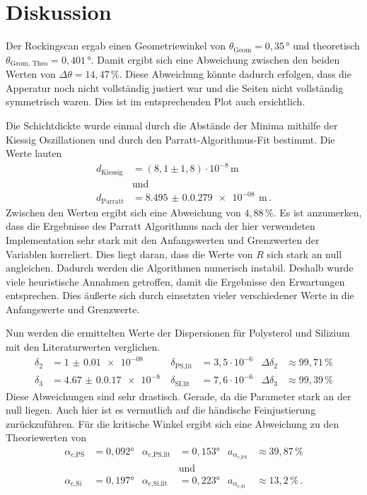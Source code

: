 \section{Diskussion}
\label{sec:Diskussion}

Der Rockingscan ergab einen Geometriewinkel von $\theta_\text{Geom} = 0{,}35 \, \unit\degree$ und theoretisch
$\theta_\text{Geom, Theo} = 0{,}401 \, \unit\degree$.
Damit ergibt sich eine Abweichung zwischen den beiden Werten von $\Delta \theta = 14{,}47 \, \%$.
Diese Abweichung könnte dadurch erfolgen, dass die Apperatur noch nicht vollständig justiert war und die Seiten nicht vollständig symmetrisch waren.
Dies ist im entsprechenden Plot auch ersichtlich.

Die Schichtdickte wurde einmal durch die Abstände der Minima mithilfe der Kiessig Oszillationen und durch den Parratt-Algorithmus-Fit bestimmt.
Die Werte lauten
\begin{align*}
    d_\text{Kiessig} &=  (8{,}1 \pm 1{,}8) \cdot 10^{-8} \, \unit\meter\\
    & \text{und} \\
    d_\text{Parratt} & = \qty{8.495(0.0279)e-08}{} \, \unit\meter \, .
\end{align*}
Zwischen den Werten ergibt sich eine Abweichung von $4{,}88\, \%$.
Es ist anzumerken, dass die Ergebnisse des Parratt Algorithmus nach der hier verwendeten Implementation sehr stark mit den Anfangswerten und Grenzwerten der Variablen korreliert.
Dies liegt daran, dass die Werte von $R$ sich stark an null angleichen.
Dadurch werden die Algorithmen numerisch instabil.
Deshalb wurde viele heuristische Annahmen getroffen, damit die Ergebnisse den Erwartungen entsprechen.
Dies äußerte sich durch einsetzten vieler verschiedener Werte in die Anfangswerte und Grenzwerte.

Nun werden die ermittelten Werte der Dispersionen für Polysterol und Silizium mit den Literaturwerten \cite{v44} verglichen.
\begin{align*}
    \delta_2 &= \qty{1(0.01)e-08}{} & \delta_{\text{PS,lit}} &= 3{,}5 \cdot 10^{-6} & \Delta {\delta_2} &\approx 99{,}71\, \% \\
    \delta_3 &= \qty{4.67(0.017)e-8}{} & \delta_{\text{SI,lit}} &= 7{,}6 \cdot 10^{-6} & \Delta {\delta_3} &\approx 99{,}39\, \%
\end{align*}
Diese Abweichungen sind sehr drastisch. Gerade, da die Parameter stark an der null liegen.
Auch hier ist es vermutlich auf die händische Feinjustierung zurückzuführen.
Für die kritische Winkel ergibt sich eine Abweichung zu den Theoriewerten \cite{tolan_xray} von
\begin{align*}
    \alpha_{\text{c,PS}} &= 0{,}092° & \alpha_{\text{c,PS,lit}} &= 0{,}153° & a_{\alpha_{\text{c,PS}}} &\approx 39{,}87 \, \%  \\
    &&&\text{und}&& \\
    \alpha_{\text{c,Si}} &= 0{,}197° & \alpha_{\text{c,Si,lit}} &= 0{,}223° & a_{\alpha_{\text{c,Si}}} &\approx 13{,}2 \, \% \, .
\end{align*}